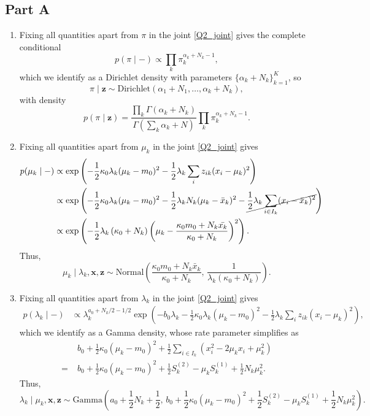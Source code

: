 \documentclass[12pt]{article}
\begin{document}
\subsection*{Part A}
\begin{enumerate}[label=(\alph*)]
    \item Fixing all quantities apart from $\pi$ in the joint \eqref{Q2_joint}
    gives the complete conditional \[
        p(\pi\mid - ) \propto \prod_k \pi_k^{\alpha_k + N_k - 1},
    \] which we identify as a Dirichlet density with parameters $\{\alpha_k +
    N_k\}_{k = 1}^K$, so \[
        \boxed{
            \pi \mid \bm{z} \sim \text{Dirichlet}(\alpha_1 + N_1, \dots, \alpha_k + N_k),
        }
    \] with density \[
        \boxed{
            p(\pi\mid \bm{z}) = \frac{\prod_k \Gamma(\alpha_k + N_k)}{\Gamma(\sum_k \alpha_k + N)} \prod_k \pi_k^{\alpha_k + N_k - 1}.
        }
    \]

    \item Fixing all quantities apart from $\mu_k$ in the joint
    \eqref{Q2_joint} gives \begin{align*}
        p(\mu_k \mid -)
            &\propto \exp\left(-\frac{1}{2}\kappa_0\lambda_k(\mu_k - m_0)^2 -\frac{1}{2}\lambda_k\sum_i z_{ik}(x_i - \mu_k)^2\right) \\
            &\propto \exp\left(-\frac{1}{2}\kappa_0\lambda_k(\mu_k - m_0)^2 -\frac{1}{2}\lambda_k N_k (\mu_k - \bar{x}_k)^2 - \cancel{\frac{1}{2}\lambda_k\sum_{i \in I_k} (x_i - \bar{x}_k)^2}\right) \\
            &\propto \exp\left(-\frac{1}{2}\lambda_k\left(\kappa_0 + N_k\right)\left(\mu_k - \frac{\kappa_0 m_0 + N_k\bar{x_k}}{\kappa_0 + N_k}\right)^2\right).
    \end{align*}
    Thus, \[
        \boxed{
            \mu_k \mid \lambda_k, \bm{x}, \bm{z} \sim \text{Normal}\left(\frac{\kappa_0m_0 + N_k\bar{x}_k}{\kappa_0 + N_k},\, \frac{1}{\lambda_k(\kappa_0 + N_k)}\right).
        }
    \]

    \item Fixing all quantities apart from $\lambda_k$ in the joint
    \eqref{Q2_joint} gives \begin{align*}
        p(\lambda_k \mid -)
            &\propto \lambda_k^{a_0 + N_k / 2 - 1 /2}
                \exp\left(-b_0\lambda_k -\frac{1}{2}\kappa_0\lambda_k(\mu_k - m_0)^2 -\frac{1}{2}\lambda_k\sum_i z_{ik}(x_i - \mu_k)^2\right),
    \end{align*}
    which we identify as a Gamma density, whose rate parameter simplifies as
    \begin{align*}
        &b_0 + \frac{1}{2}\kappa_0(\mu_k - m_0)^2 + \frac{1}{2}\sum_{i \in I_k}\left(x_i^2 - 2\mu_k x_i + \mu_k^2\right) \\
            = \;&b_0 + \frac{1}{2}\kappa_0(\mu_k - m_0)^2 + \frac{1}{2}S_k^{(2)} - \mu_k S_k^{(1)} + \frac{1}{2}N_k\mu_k^2.
    \end{align*}
    Thus, \[
        \boxed{
            \lambda_k \mid \mu_k, \bm{x}, \bm{z} \sim \text{Gamma}\left(
                a_0 + \frac{1}{2}N_k + \frac{1}{2},\,
                b_0 + \frac{1}{2}\kappa_0(\mu_k - m_0)^2 + \frac{1}{2}S_k^{(2)} - \mu_k S_k^{(1)} + \frac{1}{2}N_k\mu_k^2
            \right).
        }
    \]


\end{enumerate}
\end{document}
